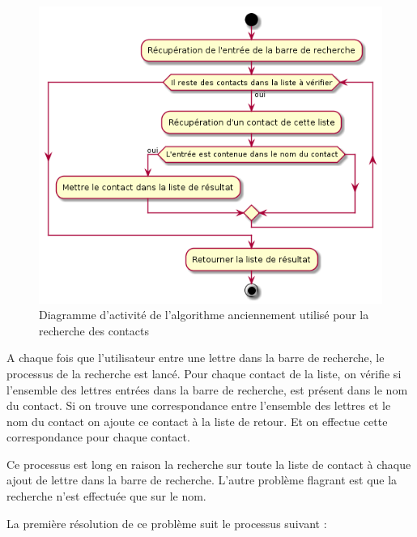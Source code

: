 \begin{figure}[!h]
	\centering
	\includegraphics[scale=0.8]{img/activity_retrieve_old.png}
	\caption{\label{activity_retrieve_old} {Diagramme d'activité de l'algorithme anciennement utilisé pour la recherche des contacts}}
\end{figure}

A chaque fois que l'utilisateur entre une lettre dans la barre de recherche, le processus de la recherche est lancé. Pour chaque contact de la liste, on vérifie si l'ensemble des lettres entrées dans la barre de recherche, est présent dans le nom du contact. Si on trouve une correspondance entre l'ensemble des lettres et le nom du contact on ajoute ce contact à la liste de retour. Et on effectue cette correspondance pour chaque contact.

Ce processus est long en raison la recherche sur toute la liste de contact à chaque ajout de lettre dans la barre de recherche. L'autre problème flagrant est que la recherche n'est effectuée que sur le nom.

\newpage

La première résolution de ce problème suit le processus suivant :

